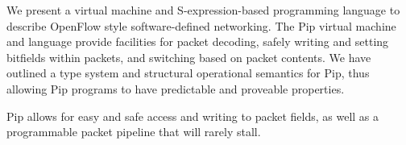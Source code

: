 \documentclass{article}
\begin{document}
We present a virtual machine and S-expression-based programming language to describe OpenFlow style software-defined networking. The Pip virtual machine and language provide facilities for packet decoding, safely writing and setting bitfields within packets, and switching based on packet contents. We have outlined a type system and structural operational semantics for Pip, thus allowing Pip programs to have predictable and proveable properties.

Pip allows for easy and safe access and writing to packet fields, as well as a programmable packet pipeline that will rarely stall.
\end{document}
